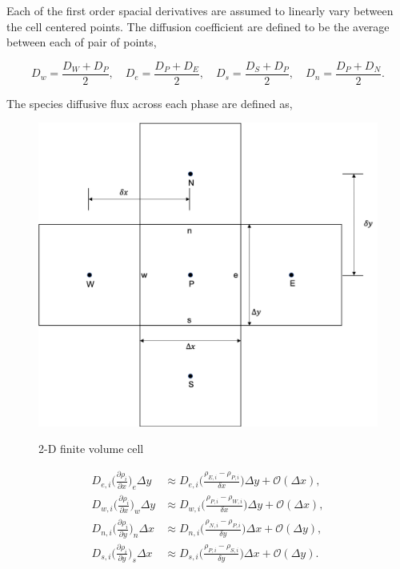 \noindent Each of the first order spacial derivatives are assumed to linearly vary between the cell centered points. The diffusion coefficient are defined to be the average between each of pair of points,

\begin{equation}
    D_{w} =\frac{D_{W} + D_{P}}{2}, \quad D_{e} =\frac{D_{P} + D_{E}}{2}, \quad D_{s} =\frac{D_{S} + D_{P}}{2}, \quad D_{n} =\frac{D_{P} + D_{N}}{2}. 
\end{equation}

\noindent The species diffusive flux across each phase are defined as,

\clearpage

\begin{figure}[p]
  \centering
  \includegraphics[width=5in]{images/chapter-4/2DFiniteVoluem.png}\\
  \caption{2-D finite volume cell}
  \label{fig:2DFiniteVolume}
\end{figure} 

\clearpage


\begin{equation}
\begin{split}
    D_{e,i}\bigg(\frac{\partial \rho_{i}}{\partial x}\bigg)_{e}\Delta y &\approx
    D_{e,i}\bigg(\frac{\rho_{E,i} - \rho_{P,i}}{\delta x}\bigg)\Delta y +
    \mathcal{O}(\Delta x),
    \\
    D_{w,i}\bigg(\frac{\partial \rho_{i}}{\partial x}\bigg)_{w}\Delta y &\approx
    D_{w,i}\bigg(\frac{\rho_{P,i} - \rho_{W,i}}{\delta x}\bigg)\Delta y + \mathcal{O}(\Delta x),
    \\
    D_{n,i}\bigg(\frac{\partial \rho_{i}}{\partial y}\bigg)_{n}\Delta x &\approx
    D_{n,i}\bigg(\frac{\rho_{N,i} - \rho_{P,i}}{\delta y}\bigg)\Delta x +
    \mathcal{O}(\Delta y),
    \\
    D_{s,i}\bigg(\frac{\partial \rho_{i}}{\partial y}\bigg)_{s}\Delta x &\approx
    D_{s,i}\bigg(\frac{\rho_{P,i} - \rho_{S,i}}{\delta y}\bigg)\Delta x +
    \mathcal{O}(\Delta y).
\end{split}
\end{equation}

